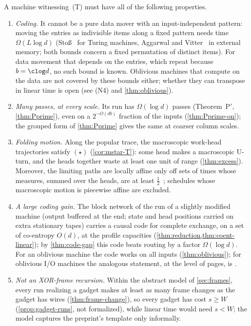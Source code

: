 A machine witnessing~(T) must have all of the following properties.
\begin{enumerate}[label=(N\arabic*),leftmargin=3em]
\item \emph{Coding.} It cannot be a pure data mover with an input-independent pattern: moving the entries as indivisible items along a fixed pattern needs time $\Omega(L\log d)$ (Sto\ss~\cite{Stoss1973} for Turing machines, Aggarwal and Vitter~\cite{AggarwalVitter1988} in
external memory; both bounds concern a fixed permutation of distinct items). For data movement that depends on the entries, which repeat because $b=\clog d$, no such bound is known. Oblivious machines that compute on the data are not covered by these bounds either; whether they can transpose in linear time is open (see (N4) and \cref{thm:oblivious}).
\item \emph{Many passes, at every scale.} Its run has $\Omega(\log d)$ passes (Theorem~P$'$,
\cref{thm:Pprime}), even on a $2^{-O(db)}$ fraction of the inputs (\cref{thm:Pprime-on}); the grouped form of
\cref{thm:Pprime} gives the same at coarser column scales.
\item \emph{Folding motion.} Along the popular trace, the macroscopic work-head trajectories satisfy $(\star)$
(\cref{cor:mstar-T}): some head makes a macroscopic U-turn, and the heads together waste at least one unit of range (\cref{thm:excess}). Moreover, the limiting paths are locally affine only off sets of times whose measures, summed over the heads, are at least $\tfrac12$~\cite{BrendeAstra2026}; schedules whose macroscopic motion is piecewise affine are excluded.
\item \emph{A large coding gain.} The block network of the run of a slightly modified machine (output buffered at
the end; state and head positions carried on extra stationary tapes) carries a causal code for complete exchange,
on a set of co-entropy $O(d)$, at the profile capacities (\cref{thm:reduction,thm:coent-linear}); by
\cref{thm:code-gap} this code beats routing by a factor $\Omega(\log d)$. For an oblivious machine the code works
on all inputs (\cref{thm:oblivious}); for oblivious I/O machines the analogous statement, at the level of pages, is
\cite[Thm.~6.2]{AHJKL2006}.
\item \emph{Not an XOR-frame recursion.} Within the abstract model of \cref{sec:frames}, every run realizing a gadget makes at least as many frame changes as the gadget has wires (\cref{thm:frame-change}), so every gadget has cost $s\ge W$ (\cref{prop:gadget-runs}, not formalized), while linear time would need $s<W$; the
model captures the preprint's template only informally.
\end{enumerate}

